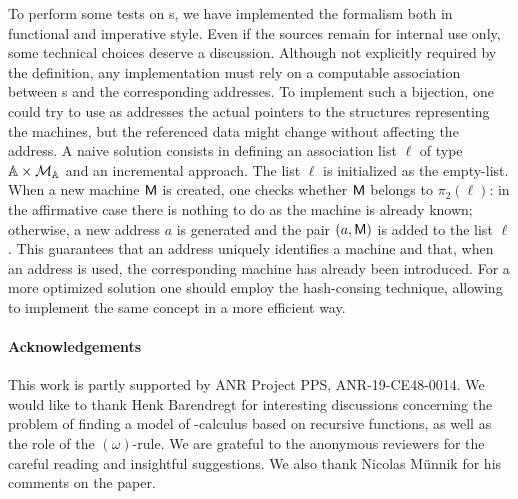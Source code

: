 To perform some tests on \am s, we have implemented the formalism both in functional and imperative style. Even if the sources remain for internal use only, some technical choices deserve a discussion. Although not explicitly required by the  definition, any implementation must rely on a computable association between \am s and the corresponding addresses. To implement such a bijection, one could try to use as addresses the actual pointers to the structures representing the machines, but the referenced data might change without affecting the address.
A naive solution consists in defining an association list $\ell$ of type $\mathbb{A} \times \mathcal{M}_{\mathbb{A}}$ and an incremental approach. The list $\ell$ is initialized as the empty-list. When a new machine $\mathsf M$ is created, one checks whether $\mathsf M$ belongs to $\pi_2(\ell)$: in the affirmative case there is nothing to do as the machine is already known; otherwise, a new address $a$ is generated and the pair $(a,\mathsf M)$ is added to the list $\ell$. This guarantees that an address uniquely identifies a machine and that, when an address is used, the corresponding machine has already been introduced. For a more optimized solution one should employ the hash-consing technique, allowing to implement the same concept in a more efficient way.
\smallskip

\paragraph{Acknowledgements} This work is partly supported by ANR Project PPS, ANR-19-CE48-0014. We would like to thank Henk Barendregt for interesting discussions concerning the problem of finding a model of \lam-calculus based on recursive functions, as well as the role of the $(\omega)$-rule. %
We are grateful to the anonymous reviewers for the careful reading and insightful suggestions.
We also thank Nicolas M\"unnik for his comments on the paper.
